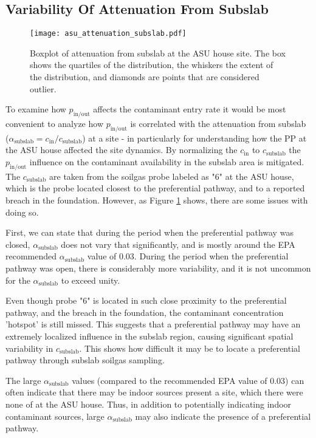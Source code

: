 \documentclass[journal=esthag,manuscript=article]{achemso}
\begin{document}
\subsection{Variability Of Attenuation From Subslab}

\begin{figure}[htb!]
  \caption{Boxplot of attenuation from subslab at the ASU house site. The box shows the quartiles of the distribution, the whiskers the extent of the distribution, and diamonds are points that are considered outlier.}\label{fig:attenuation_subslab}
  \texttt{[image: asu\_attenuation\_subslab.pdf]}
\end{figure}

To examine how $p_\mathrm{in/out}$ affects the contaminant entry rate it would be most convenient to analyze how $p_\mathrm{in/out}$ is correlated with the attenuation from subslab ($\alpha_\mathrm{subslab} = c_\mathrm{in}/c_\mathrm{subslab}$) at a site - in particularly for understanding how the PP at the ASU house affected the site dynamics.
By normalizing the $c_\mathrm{in}$ to $c_\mathrm{subslab}$ the $p_\mathrm{in/out}$ influence on the contaminant availability in the subslab area is mitigated.
The $c_\mathrm{subslab}$ are taken from the soilgas probe labeled as "6" at the ASU house, which is the probe located closest to the preferential pathway, and to a reported breach in the foundation\cite{guo_identification_2015}.
However, as Figure \ref{fig:attenuation_subslab} shows, there are some issues with doing so.

First, we can state that during the period when the preferential pathway was closed, $\alpha_\mathrm{subslab}$ does not vary that significantly, and is mostly around the EPA recommended $\alpha_\mathrm{subslab}$ value of 0.03. %
During the period when the preferential pathway was open, there is considerably more variability, and it is not uncommon for the $\alpha_\mathrm{subslab}$ to exceed unity.

Even though probe "6" is located in such close proximity to the preferential pathway, and the breach in the foundation, the contaminant concentration 'hotspot' is still missed.
This suggests that a preferential pathway may have an extremely localized influence in the subslab region, causing significant spatial variability in $c_\mathrm{subslab}$.
This shows how difficult it may be to locate a preferential pathway through subslab soilgas sampling.

The large $\alpha_\mathrm{subslab}$ values (compared to the recommended EPA value of 0.03) can often indicate that there may be indoor sources present a site, which there were none of at the ASU house.
Thus, in addition to potentially indicating indoor contaminant sources, large $\alpha_\mathrm{subslab}$ may also indicate the presence of a preferential pathway.
\end{document}
